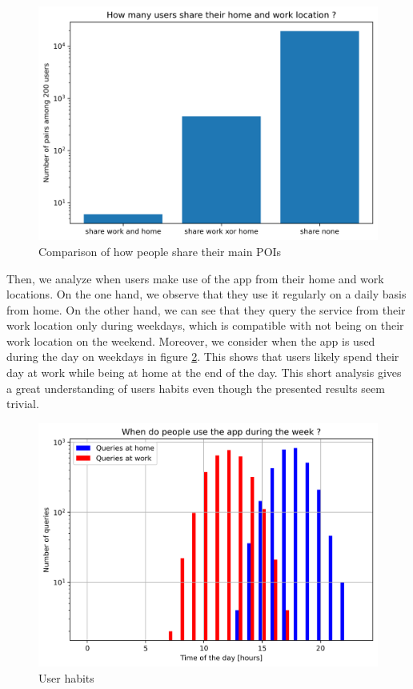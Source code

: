 \documentclass[10pt,conference,compsocconf]{IEEEtran}
\begin{document}
\begin{figure}
  \includegraphics[width=\columnwidth]{share.png}
  \caption{Comparison of how people share their main POIs}
  \label{share_fig}
\end{figure}

Then, we analyze when users make use of the app from their home and work locations. On the one hand, we observe that they use it regularly on a daily basis from home. On the other hand, we can see that they query the service from their work location only during weekdays, which is compatible with not being on their work location on the weekend. Moreover, we consider when the app is used during the day on weekdays in figure \ref{when_fig}. This shows that users likely spend their day at work while being at home at the end of the day. This short analysis gives a great understanding of users habits even though the presented results seem trivial.

\begin{figure}
  \includegraphics[width=\columnwidth]{when.png}
  \caption{User habits}
  \label{when_fig}
\end{figure}
\end{document}

